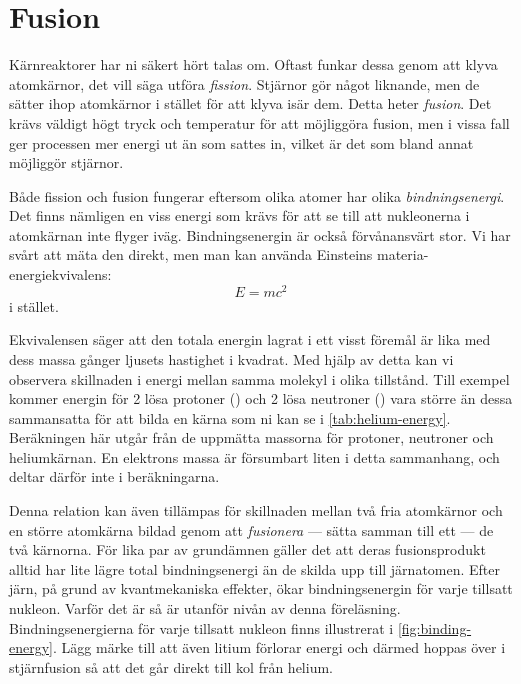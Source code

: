 \section{Fusion}
Kärnreaktorer har ni säkert hört talas om. Oftast funkar dessa genom att klyva atomkärnor, det vill säga utföra \emph{fission}. Stjärnor gör något liknande, men de sätter ihop atomkärnor i stället för att klyva isär dem. Detta heter \emph{fusion}. Det krävs väldigt högt tryck och temperatur för att möjliggöra fusion, men i vissa fall ger processen mer energi ut än som sattes in, vilket är det som bland annat möjliggör stjärnor.

Både fission och fusion fungerar eftersom olika atomer har olika \emph{bindningsenergi}. Det finns nämligen en viss energi som krävs för att se till att nukleonerna i atomkärnan inte flyger iväg. Bindningsenergin är också förvånansvärt stor. Vi har svårt att mäta den direkt, men man kan använda Einsteins materia-energiekvivalens:
\begin{equation}
    E = mc^2
    \label{eq:emc2}
\end{equation}
i stället.

Ekvivalensen säger att den totala energin lagrat i ett visst föremål är lika med dess massa gånger ljusets hastighet i kvadrat. Med hjälp av detta kan vi observera skillnaden i energi mellan samma molekyl i olika tillstånd. Till exempel kommer energin för 2 lösa protoner () och 2 lösa neutroner () vara större än dessa sammansatta för att bilda en  kärna som ni kan se i \vref{tab:helium-energy}. Beräkningen här utgår från de uppmätta massorna för protoner, neutroner och heliumkärnan. En elektrons massa är försumbart liten i detta sammanhang, och deltar därför inte i beräkningarna.

Denna relation kan även tillämpas för skillnaden mellan två fria atomkärnor och en större atomkärna bildad genom att \emph{fusionera} --- sätta samman till ett --- de två kärnorna. För lika par av grundämnen gäller det att deras fusionsprodukt alltid har lite lägre total bindningsenergi än de skilda upp till järnatomen. Efter järn, på grund av kvantmekaniska effekter, ökar bindningsenergin för varje tillsatt nukleon. Varför det är så är utanför nivån av denna föreläsning. Bindningsenergierna för varje tillsatt nukleon finns illustrerat i \cref{fig:binding-energy}. Lägg märke till att även litium förlorar energi och därmed hoppas över i stjärnfusion så att det går direkt till kol från helium.

